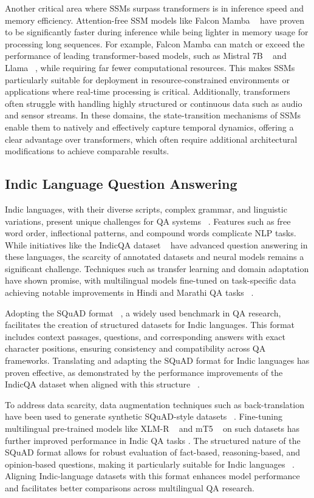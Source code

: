 Another critical area where SSMs surpass transformers is in inference speed and memory efficiency. Attention-free SSM models like Falcon Mamba ~\cite{zuo2024} have proven to be significantly faster during inference while being lighter in memory usage for processing long sequences. For example, Falcon Mamba can match or exceed the performance of leading transformer-based models, such as Mistral 7B ~\cite{jiang2023mistral7b} and Llama ~\cite{touvron2023llamaopenefficientfoundation}, while requiring far fewer computational resources. This makes SSMs particularly suitable for deployment in resource-constrained environments or applications where real-time processing is critical. Additionally, transformers often struggle with handling highly structured or continuous data such as audio and sensor streams. In these domains, the state-transition mechanisms of SSMs enable them to natively and effectively capture temporal dynamics, offering a clear advantage over transformers, which often require additional architectural modifications to achieve comparable results.

\subsection{Indic Language Question Answering}
Indic languages, with their diverse scripts, complex grammar, and linguistic variations, present unique challenges for QA systems ~\cite{dani2024reviewmarathinaturallanguage}. Features such as free word order, inflectional patterns, and compound words complicate NLP tasks. While initiatives like the IndicQA dataset ~\cite{sabane2024} have advanced question answering in these languages, the scarcity of annotated datasets and neural models remains a significant challenge. Techniques such as transfer learning and domain adaptation have shown promise, with multilingual models fine-tuned on task-specific data achieving notable improvements in Hindi and Marathi QA tasks ~\cite{jin2022low}.

Adopting the SQuAD format ~\cite{rajpurkar2016squad}, a widely used benchmark in QA research, facilitates the creation of structured datasets for Indic languages. This format includes context passages, questions, and corresponding answers with exact character positions, ensuring consistency and compatibility across QA frameworks. Translating and adapting the SQuAD format for Indic languages has proven effective, as demonstrated by the performance improvements of the IndicQA dataset when aligned with this structure ~\cite{singh2024indicqabenchmarkmultilingual}.

To address data scarcity, data augmentation techniques such as back-translation have been used to generate synthetic SQuAD-style datasets ~\cite{Khan_2024}. Fine-tuning multilingual pre-trained models like XLM-R ~\cite{conneau2020unsupervised} and mT5 ~\cite{xue2021mt5} on such datasets has further improved performance in Indic QA tasks . The structured nature of the SQuAD format allows for robust evaluation of fact-based, reasoning-based, and opinion-based questions, making it particularly suitable for Indic languages ~\cite{UPADHYAY2024100088}. Aligning Indic-language datasets with this format enhances model performance and facilitates better comparisons across multilingual QA research.